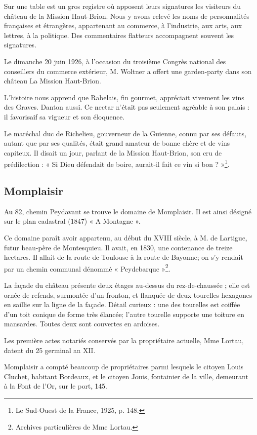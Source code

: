 Sur une table est un gros registre où apposent leurs signatures les visiteurs du château de la Mission Haut-Brion. Nous y avons relevé les noms de personnalités françaises et étrangères, appartenant au commerce, à l'industrie, aux arts, aux lettres, à la politique. Des commentaires flatteurs accompagnent souvent les signatures.

Le dimanche 20 juin 1926, à l'occasion du troisième Congrès national des conseillers du commerce extérieur, M. Woltner a offert une garden-party dans son château La Mission Haut-Brion.

L'histoire nous apprend que Rabelais, fin gourmet, appréciait vivement les vins des Graves. Danton aussi. Ce nectar n'était pas seulement agréable à son palais : il favorisaif sa vigueur et son éloquence.

Le maréchal duc de Richelieu, gouverneur de la Guienne, connu par ses défauts, autant que par ses qualités, était grand amateur de bonne chère et de vins capiteux. Il disait un jour, parlant de la Mission Haut-Brion, son cru de prédilection : « Si Dieu défendait de boire, aurait-il fait ce vin si bon ? »\footnote{Le Sud-Ouest de la France, 1925, p. 148.}.

\subsection{Momplaisir}

Au 82, chemin Peydavant se trouve le domaine de Momplaisir. Il est ainsi désigné sur le plan cadastral (1847) « A Montagne ».

Ce domaine paraît avoir appartenu, au début du XVIII\ieme{} siècle, à M. de Lartigue, futur beau-père de Montesquieu. Il avait, en 1830, une contenance de treize hectares. Il allait de la route de Toulouse à la route de Bayonne; on s'y rendait par un chemin communal dénommé 
« Peydebarque »\footnote{Archives particulières de Mme Lortau.}.

La façade du château présente deux étages au-dessus du rez-de-chaussée ; elle est ornée de refends, surmontée d'un fronton, et flanquée de deux tourelles hexagones en saillie sur la ligne de la façade. Détail curieux : une des tourelles est coiffée d'un toit conique de forme très élancée; l'autre tourelle supporte une toiture en mansardes. Toutes deux sont couvertes en ardoises.

Les première actes notariés conservés par la propriétaire actuelle, Mme Lortau, datent du 25 germinal an XII.

Momplaisir a compté beaucoup de propriétaires parmi lesquels le citoyen Louis Cluchet, habitant Bordeaux, et le citoyen Jouis, fontainier de la ville, demeurant à la Font de l'Or, sur le port, 145.

